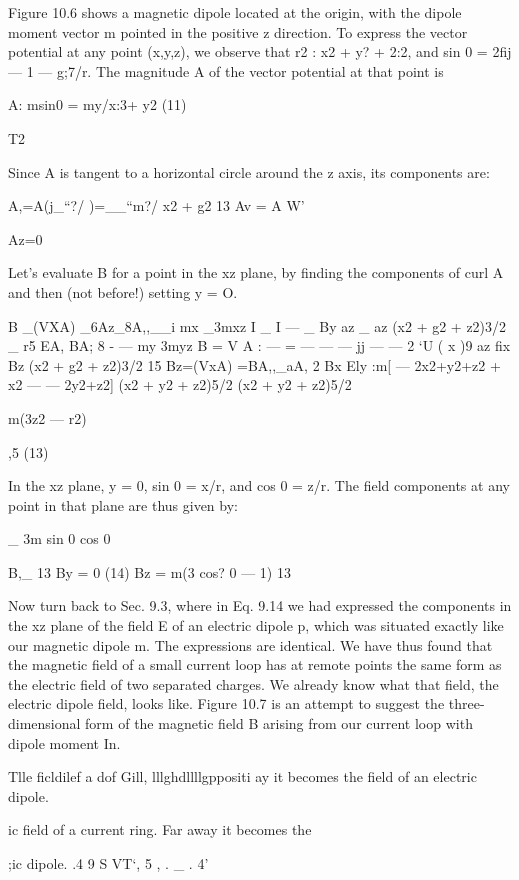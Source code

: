 {{Figure 10.6 shows a magnetic dipole located at the origin, with the
dipole moment vector m pointed in the positive z direction. To express
the vector potential at any point (x,y,z), we observe that
r2 : x2 + y? + 2:2, and sin 0 = \/2fij --- 1 --- g;7/r. The magnitude A of
the vector potential at that point is

A: msin0 = my/x:3+ y2 (11)

T2

Since A is tangent to a horizontal circle around the z axis, its components
are:

A,=A(j_``?/ )=__``m?/
\/x2 + g2 13
Av = A  W'

Az=0

Let's evaluate B for a point in the xz plane, by finding the components
of curl A and then (not before!) setting y = O.

B _(VXA) _6Az_8A,,__i mx _3mxz
I _ I  --- _ By az _ az (x2 + g2 + z2)3/2 _ r5
EA, BA; 8 - --- my 3myz
B = V A :  ---  =  ---  ---  --- jj ---  ---  2
‘U ( x )9 az fix Bz (x2 + g2 + z2)3/2 15
Bz=(VxA) =BA,,_aA,
2 Bx Ely
:m[ --- 2x2+y2+z2 + x2 ---  --- 2y2+z2]
(x2 + y2 + z2)5/2 (x2 + y2 + z2)5/2

m(3z2  ---  r2)

,5 (13)

In the xz plane, y = 0, sin 0 = x/r, and cos 0 = z/r. The field components
at any point in that plane are thus given by:

_ 3m sin 0 cos 0

B,_ 13
By = 0 (14)
Bz = m(3 cos? 0  ---  1)
13

Now turn back to Sec. 9.3, where in Eq. 9.14 we had expressed
the components in the xz plane of the field E of an electric dipole p,
which was situated exactly like our magnetic dipole m. The expressions
are identical. We have thus found that the magnetic field of a
small current loop has at remote points the same form as the electric
field of two separated charges. We already know what that field,
the electric dipole field, looks like. Figure 10.7 is an attempt to
suggest the three-dimensional form of the magnetic field B arising
from our current loop with dipole moment In.

 

Tlle  ficldilef a  dof Gill, lllghdllllgppositi
ay it becomes the field of an electric dipole.

ic field of a current ring. Far away it becomes the

;ic dipole.
.4 9 S VT‘, 5 , . _ . 4'

}}
